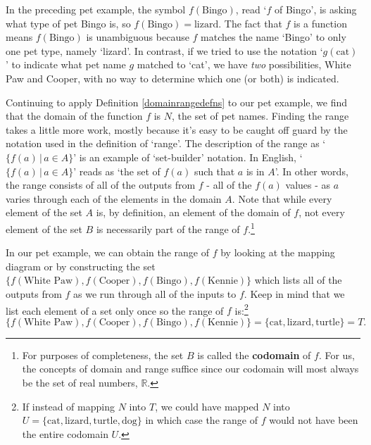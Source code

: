 
In the preceding pet example, the symbol $f(\text{Bingo})$, read `$f$ of Bingo', is asking what type of pet Bingo is, so $f(\text{Bingo}) = \text{lizard}$.  The fact that $f$ is a function means $f(\text{Bingo})$ is unambiguous because $f$ matches the name `Bingo' to only one pet type, namely `lizard'. In contrast, if we tried to use the notation `$g(\text{cat})$' to indicate what pet name $g$ matched to `cat', we have \textit{two} possibilities, White Paw and Cooper, with no way to determine which one (or both) is indicated.  

\medskip

Continuing to apply Definition \ref{domainrangedefns} to our pet example, we find that the domain of the function $f$ is $N$, the set of pet names.  Finding the range takes a little more work, mostly because it's easy to be caught off guard by the notation used in the definition of `range'.  The description of the range as `$\{ f(a) \, | \, a \in A \}$' is an example of `set-builder' notation.  In English,  `$\{ f(a) \, | \, a \in A \}$'  reads as `the set of $f(a)$ such that $a$ is in $A$'.  In other words, the range consists of all of the outputs from $f$ - all of the $f(a)$ values - as $a$ varies through each of the elements in the domain $A$.   Note that while every element of the set $A$ is, by definition, an element of the domain of $f$, not every element of the set $B$ is necessarily part of the range of $f$.\footnote{For purposes of completeness, the set $B$ is called the  \textbf{codomain} of $f$.  For us, the concepts of domain and range suffice since our codomain will most always be the set of real numbers, $\mathbb{R}$.}

\medskip

In our pet example, we can obtain the range of $f$  by looking at the mapping diagram or by constructing the set $\{ f(\text{White Paw}), f(\text{Cooper}), f(\text{Bingo}), f(\text{Kennie}) \}$ which lists all of the outputs from $f$ as we run through all of the inputs to $f$.   Keep in mind that we list each element of a set only once so the range of $f$ is:\footnote{If instead of mapping $N$ into $T$, we could have mapped $N$ into $U=\{ \text{cat}, \text{lizard}, \text{turtle}, \text{dog}\}$ in which case the range of $f$ would not have been the entire codomain $U$.}  \[ \{ f(\text{White Paw}), f(\text{Cooper}), f(\text{Bingo}), f(\text{Kennie}) \} = \{ \text{cat}, \text{lizard}, \text{turtle} \} = T.\] 


